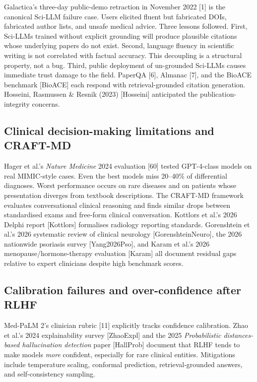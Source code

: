Galactica's three-day public-demo retraction in November 2022 {[}1{]} is the canonical Sci-LLM failure case. Users elicited fluent but fabricated DOIs, fabricated author lists, and unsafe medical advice. Three lessons followed. First, Sci-LLMs trained without explicit grounding will produce plausible citations whose underlying papers do not exist. Second, language fluency in scientific writing is not correlated with factual accuracy. This decoupling is a structural property, not a bug. Third, public deployment of un-grounded Sci-LLMs causes immediate trust damage to the field. PaperQA {[}6{]}, Almanac {[}7{]}, and the BioACE benchmark {[}BioACE{]} each respond with retrieval-grounded citation generation. Hosseini, Rasmussen \& Resnik (2023) {[}Hosseini{]} anticipated the publication-integrity concerns.

\subsection{Clinical decision-making limitations and CRAFT-MD}\label{clinical-decision-making-limitations-and-craft-md}

Hager et al.'s \emph{Nature Medicine} 2024 evaluation {[}60{]} tested GPT-4-class models on real MIMIC-style cases. Even the best models miss 20--40\% of differential diagnoses. Worst performance occurs on rare diseases and on patients whose presentation diverges from textbook descriptions. The CRAFT-MD framework evaluates conversational clinical reasoning and finds similar drops between standardised exams and free-form clinical conversation. Kottlors et al.'s 2026 Delphi report {[}Kottlors{]} formalises radiology reporting standards. Gorenshtein et al.'s 2026 systematic review of clinical neurology {[}GorenshteinNeuro{]}, the 2026 nationwide psoriasis survey {[}Yang2026Pso{]}, and Karam et al.'s 2026 menopause/hormone-therapy evaluation {[}Karam{]} all document residual gaps relative to expert clinicians despite high benchmark scores.

\subsection{Calibration failures and over-confidence after RLHF}\label{calibration-failures-and-over-confidence-after-rlhf}

Med-PaLM 2's clinician rubric {[}11{]} explicitly tracks confidence calibration. Zhao et al.'s 2024 explainability survey {[}ZhaoExpl{]} and the 2025 \emph{Probabilistic distances-based hallucination detection} paper {[}HallProb{]} document that RLHF tends to make models \emph{more} confident, especially for rare clinical entities. Mitigations include temperature scaling, conformal prediction, retrieval-grounded answers, and self-consistency sampling.

